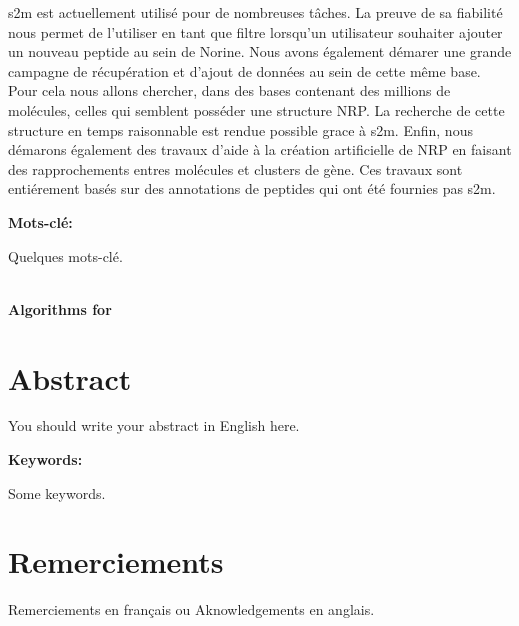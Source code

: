 \documentclass[12pt]{LHSV_thesis}
\begin{document}
s2m est actuellement utilisé pour de nombreuses tâches.
La preuve de sa fiabilité nous permet de l'utiliser en tant que filtre lorsqu'un utilisateur souhaiter ajouter un nouveau peptide au sein de Norine.
Nous avons également démarer une grande campagne de récupération et d'ajout de données au sein de cette même base.
Pour cela nous allons chercher, dans des bases contenant des millions de molécules, celles qui semblent posséder une structure NRP.
La recherche de cette structure en temps raisonnable est rendue possible grace à s2m.
Enfin, nous démarons également des travaux d'aide à la création artificielle de NRP en faisant des rapprochements entres molécules et clusters de gène.
Ces travaux sont entiérement basés sur des annotations de peptides qui ont été fournies pas s2m.


\vspace*{28pt}\par
\textbf{Mots-clé:}\par
Quelques mots-clé.
\par
\clearpage

\begin{center}
~\vspace{6.0cm}\\
\thispagestyle{plain}
\Huge \textbf{Algorithms for }
\vspace*{\fill}
\clearpage
\end{center}

\section*{\Huge Abstract}
%
\vspace{2cm}

You should write your abstract in English here.
\vspace*{28pt}\par
\textbf{Keywords:}\par
Some keywords.
\par
\cleardoublepage

\section*{\Huge Remerciements}
%
\vspace{2cm}

Remerciements en français ou  Aknowledgements en anglais.
\end{document}
